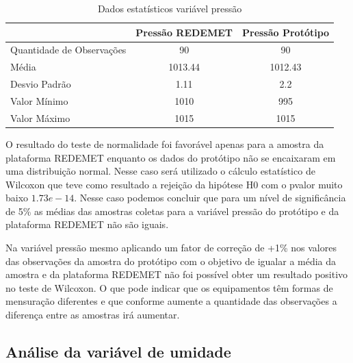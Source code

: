 \begin{table}[!h]
\centering
\begin{tabular}{l|c|c|}
\cline{2-3}
                                                & \multicolumn{1}{l|}{\textbf{Pressão REDEMET}} & \textbf{Pressão Protótipo} \\ \hline
\multicolumn{1}{|l|}{Quantidade de Observações} & 90                                            & 90                         \\ \hline
\multicolumn{1}{|l|}{Média}                     & 1013.44                                       & 1012.43                    \\ \hline
\multicolumn{1}{|l|}{Desvio Padrão}             & 1.11                                          & 2.2                        \\ \hline
\multicolumn{1}{|l|}{Valor Mínimo}              & 1010                                          & 995                        \\ \hline
\multicolumn{1}{|l|}{Valor Máximo}              & 1015                                          & 1015                       \\ \hline
\end{tabular}
\caption{Dados estatísticos variável pressão}
\label{tab:est_desc_pressao_prot}
\end{table}

O resultado do teste de normalidade foi favorável apenas para a amostra da plataforma REDEMET enquanto os dados do protótipo não se encaixaram em uma distribuição normal. Nesse caso será utilizado o cálculo estatístico de Wilcoxon que teve como resultado a rejeição da hipótese H0 com o pvalor muito baixo $1.73e-14$. Nesse caso podemos concluir que para um nível de significância de 5\% as médias das amostras coletas para a variável pressão do protótipo e da plataforma REDEMET não são iguais.

Na variável pressão mesmo aplicando um fator de correção de +1\% nos valores das observações da amostra do protótipo com o objetivo de igualar a média da amostra e da plataforma REDEMET não foi possível obter um resultado positivo no teste de Wilcoxon. O que pode indicar que os equipamentos têm formas de mensuração diferentes e que conforme aumente a quantidade das observações a diferença entre as amostras irá aumentar.

\subsection{Análise da variável de umidade}

